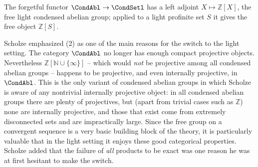 The forgetful functor $\CondAbl\to\CondSetl$ has a left adjoint $X\mapsto
\mathbb{Z}[X]$, the free light condensed abelian group; applied to a light
profinite set $S$ it gives the free object $\mathbb{Z}[S]$.

\begin{remark}
\label{rmk:2:internally-projective}
Scholze emphasized (2) as one of the main reasons
for the switch to the light setting. The category $\CondAbl$ no longer has enough
compact projective objects. Nevertheless $\mathbb{Z}[\mathbb{N}\cup\{\infty\}]$
-- which would \emph{not} be projective among all condensed abelian groups --
happens to be projective, and even internally projective, in $\CondAbl$. This is
the only variant of condensed abelian groups in which Scholze is aware of any
nontrivial internally projective object: in all condensed abelian groups there
are plenty of projectives, but (apart from trivial cases such as $\mathbb{Z}$)
none are internally projective, and those that exist come from extremely
disconnected sets and are impractically large. Since the free group on a
convergent sequence is a very basic building block of the theory, it is
particularly valuable that in the light setting it enjoys these good categorical
properties. Scholze added that the failure of \emph{all} products to be exact was
one reason he was at first hesitant to make the switch.
\end{remark}
